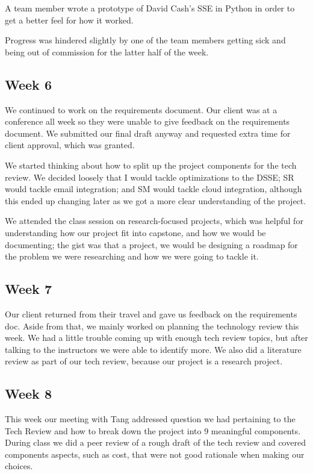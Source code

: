 \documentclass[onecolumn, draftclsnofoot,10pt, compsoc]{IEEEtran}
\begin{document}
A team member wrote a prototype of David Cash's SSE in Python in order to get a better feel for how it worked.

Progress was hindered slightly by one of the team members getting sick and being out of commission for the latter half of the week.

\subsection{Week 6} %

We continued to work on the requirements document. Our client was at a conference all week so they were unable to give feedback on the requirements document. We submitted our final draft anyway and requested extra time for client approval, which was granted.

We started thinking about how to split up the project components for the tech review. We decided loosely that I would tackle optimizations to the DSSE; SR would tackle email integration; and SM would tackle cloud integration, although this ended up changing later as we got a more clear understanding of the project.

We attended the class session on research-focused projects, which was helpful for understanding how our project fit into capstone, and how we would be documenting; the gist was that a project, we would be designing a roadmap for the problem we were researching and how we were going to tackle it.

\subsection{Week 7} %

Our client returned from their travel and gave us feedback on the requirements doc. Aside from that, we mainly worked on planning the technology review this week. We had a little trouble coming up with enough tech review topics, but after talking to the instructors we were able to identify more. We also did a literature review as part of our tech review, because our project is a research project.


\subsection{Week 8}
This week our meeting with Tang addressed question we had pertaining to the Tech Review and how to break down the project into 9 meaningful components. During class we did a peer review of a rough draft of the tech review and covered components aspects, such as cost, that were not good rationale when making our choices. 
\end{document}
